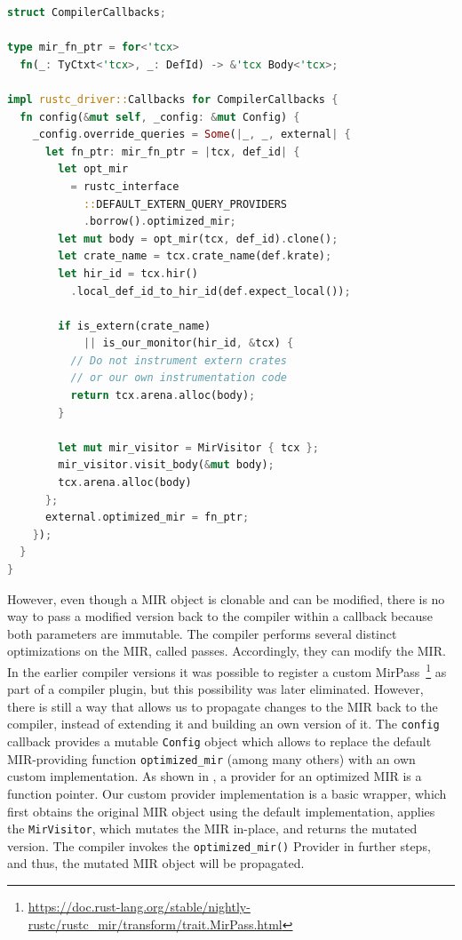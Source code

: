 \documentclass[paper=a4,%
  twoside,%
  BCOR4mm,%
  abstract=true,%
  toc=bibliography,%
  chapterprefix=true,%
  toc=bibliographynumbered,%
  open=right,%
  english,%
  pagesize=pdftex]{scrreprt}
\begin{document}
\begin{lstlisting}[language=Rust, style=boxed, caption={The Rust compiler interface accepts an object which implements its callback trait, allowing us to execute code at different compilation phases}, label=lst:compiler-callbacks]
struct CompilerCallbacks;

type mir_fn_ptr = for<'tcx>
  fn(_: TyCtxt<'tcx>, _: DefId) -> &'tcx Body<'tcx>;

impl rustc_driver::Callbacks for CompilerCallbacks {
  fn config(&mut self, _config: &mut Config) {
    _config.override_queries = Some(|_, _, external| {
      let fn_ptr: mir_fn_ptr = |tcx, def_id| {
        let opt_mir
          = rustc_interface
            ::DEFAULT_EXTERN_QUERY_PROVIDERS
            .borrow().optimized_mir;
        let mut body = opt_mir(tcx, def_id).clone();
        let crate_name = tcx.crate_name(def.krate);
        let hir_id = tcx.hir()
          .local_def_id_to_hir_id(def.expect_local());

        if is_extern(crate_name)
            || is_our_monitor(hir_id, &tcx) {
          // Do not instrument extern crates
          // or our own instrumentation code
          return tcx.arena.alloc(body);
        }

        let mut mir_visitor = MirVisitor { tcx };
        mir_visitor.visit_body(&mut body);
        tcx.arena.alloc(body)
      };
      external.optimized_mir = fn_ptr;
    });
  }
}
\end{lstlisting}
However, even though a \ac{MIR} object is clonable and can be modified, there is no way to pass a modified version back to the compiler within a callback because both parameters are immutable. The compiler performs several distinct optimizations on the \ac{MIR}, called passes. Accordingly, they can modify the \ac{MIR}. In the earlier compiler versions it was possible to register a custom MirPass~\footnote{\url{https://doc.rust-lang.org/stable/nightly-rustc/rustc_mir/transform/trait.MirPass.html}} as part of a compiler plugin, but this possibility was later eliminated. However, there is still a way that allows us to propagate changes to the MIR back to the compiler, instead of extending it and building an own version of it. The \lstinline{config} callback provides a mutable \lstinline{Config} object which allows to replace the default \ac{MIR}-providing function \lstinline{optimized_mir} (among many others) with an own custom implementation. As shown in , a provider for an optimized \ac{MIR} is a function pointer. Our custom provider implementation is a basic wrapper, which first obtains the original \ac{MIR} object using the default implementation, applies the \lstinline{MirVisitor}, which mutates the \ac{MIR} in-place, and returns the mutated version. The compiler invokes the \lstinline{optimized_mir()} Provider in further steps, and thus, the mutated \ac{MIR} object will be propagated.
\end{document}

